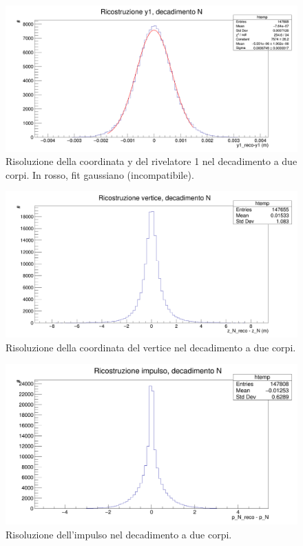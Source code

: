 \documentclass[8pt]{extarticle}
\begin{document}
\begin{figure}[!h]
\begin{center}
\includegraphics[scale=0.25]{reco_y1_N}
\caption{Risoluzione della coordinata y del rivelatore 1 nel decadimento a due corpi. In rosso, fit gaussiano (incompatibile).}
\label{fig:reco_y1_N}
\end{center}
\end{figure}

\begin{figure}[!h]
\begin{center}
\includegraphics[scale=0.25]{reco_z_N}
\caption{Risoluzione della coordinata del vertice nel decadimento a due corpi.}
\label{fig:reco_z_N}
\end{center}
\end{figure}

\begin{figure}[!h]
\begin{center}
\includegraphics[scale=0.25]{reco_p_N}
\caption{Risoluzione dell'impulso nel decadimento a due corpi.}
\label{fig:reco_p_N}
\end{center}
\end{figure}
\end{document}
